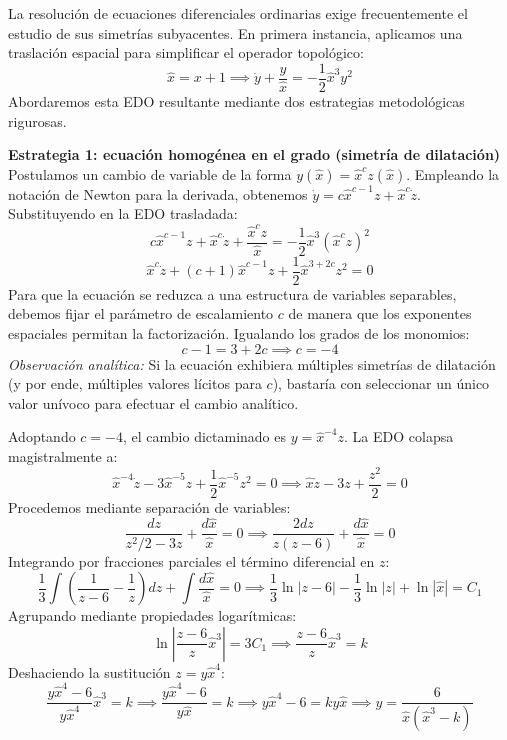 \documentclass[11pt,a4paper]{article}
\theoremstyle{definition}
\theoremstyle{plain}
\begin{document}
\begin{tcolorbox}
La resolución de ecuaciones diferenciales ordinarias exige frecuentemente el estudio de sus simetrías subyacentes. En primera instancia, aplicamos una traslación espacial para simplificar el operador topológico:
$$ \hat{x} = x + 1 \implies \dot{y} + \frac{y}{\hat{x}} = -\frac{1}{2}\hat{x}^3 y^2 $$
Abordaremos esta EDO resultante mediante dos estrategias metodológicas rigurosas.

\textbf{Estrategia 1: ecuación homogénea en el grado (simetría de dilatación)} \\
Postulamos un cambio de variable de la forma $y(\hat{x}) = \hat{x}^c z(\hat{x})$. Empleando la notación de Newton para la derivada, obtenemos $\dot{y} = c\hat{x}^{c-1}z + \hat{x}^c \dot{z}$.
Substituyendo en la EDO trasladada:
$$ c\hat{x}^{c-1}z + \hat{x}^c \dot{z} + \frac{\hat{x}^c z}{\hat{x}} = -\frac{1}{2}\hat{x}^3 (\hat{x}^c z)^2 $$
$$ \hat{x}^c \dot{z} + (c+1)\hat{x}^{c-1}z + \frac{1}{2}\hat{x}^{3+2c}z^2 = 0 $$
Para que la ecuación se reduzca a una estructura de variables separables, debemos fijar el parámetro de escalamiento $c$ de manera que los exponentes espaciales permitan la factorización. Igualando los grados de los monomios:
$$ c - 1 = 3 + 2c \implies c = -4 $$
\textit{Observación analítica:} Si la ecuación exhibiera múltiples simetrías de dilatación (y por ende, múltiples valores lícitos para $c$), bastaría con seleccionar un único valor unívoco para efectuar el cambio analítico.

Adoptando $c = -4$, el cambio dictaminado es $y = \hat{x}^{-4}z$. La EDO colapsa magistralmente a:
$$ \hat{x}^{-4}\dot{z} - 3\hat{x}^{-5}z + \frac{1}{2}\hat{x}^{-5}z^2 = 0 \implies \hat{x}\dot{z} - 3z + \frac{z^2}{2} = 0 $$
Procedemos mediante separación de variables:
$$ \frac{dz}{z^2/2 - 3z} + \frac{d\hat{x}}{\hat{x}} = 0 \implies \frac{2dz}{z(z-6)} + \frac{d\hat{x}}{\hat{x}} = 0 $$
Integrando por fracciones parciales el término diferencial en $z$:
$$ \frac{1}{3}\int \left( \frac{1}{z-6} - \frac{1}{z} \right) dz + \int \frac{d\hat{x}}{\hat{x}} = 0 \implies \frac{1}{3}\ln|z-6| - \frac{1}{3}\ln|z| + \ln|\hat{x}| = C_1 $$
Agrupando mediante propiedades logarítmicas:
$$ \ln\left| \frac{z-6}{z} \hat{x}^3 \right| = 3C_1 \implies \frac{z-6}{z}\hat{x}^3 = k $$
Deshaciendo la sustitución $z = y\hat{x}^4$:
$$ \frac{y\hat{x}^4 - 6}{y\hat{x}^4}\hat{x}^3 = k \implies \frac{y\hat{x}^4 - 6}{y\hat{x}} = k \implies y\hat{x}^4 - 6 = ky\hat{x} \implies y = \frac{6}{\hat{x}(\hat{x}^3 - k)} $$


\end{tcolorbox}
\end{document}
